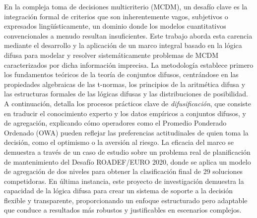 \begin{poliabstract}[Resumen]
    En la compleja toma de decisiones multicriterio (MCDM), un desafío clave es la integración formal de criterios que son inherentemente vagos, subjetivos o expresados lingüísticamente, un dominio donde los modelos cuantitativos convencionales a menudo resultan insuficientes. Este trabajo aborda esta carencia mediante el desarrollo y la aplicación de un marco integral basado en la lógica difusa para modelar y resolver sistemáticamente problemas de MCDM caracterizados por dicha información imprecisa. La metodología establece primero los fundamentos teóricos de la teoría de conjuntos difusos, centrándose en las propiedades algebraicas de las t-normas, los principios de la aritmética difusa y las estructuras formales de las lógicas difusas y las distribuciones de posibilidad. A continuación, detalla los procesos prácticos clave de \textit{difusificación}, que consiste en traducir el conocimiento experto y los datos empíricos a conjuntos difusos, y de agregación, explicando cómo operadores como el Promedio Ponderado Ordenado (OWA) pueden reflejar las preferencias actitudinales de quien toma la decisión, como el optimismo o la aversión al riesgo. La eficacia del marco se demuestra a través de un caso de estudio sobre un problema real de planificación de mantenimiento del Desafío ROADEF/EURO 2020, donde se aplica un modelo de agregación de dos niveles para obtener la clasificación final de 29 soluciones competidoras. En última instancia, este proyecto de investigación demuestra la capacidad de la lógica difusa para crear un sistema de soporte a la decisión flexible y transparente, proporcionando un enfoque estructurado pero adaptable que conduce a resultados más robustos y justificables en escenarios complejos.
\end{poliabstract}
    
